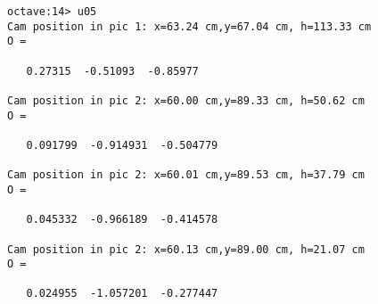 \lstset{language=matlab}
\begin{lstlisting}[caption={Ausgabe}]
octave:14> u05
Cam position in pic 1: x=63.24 cm,y=67.04 cm, h=113.33 cm
O =

   0.27315  -0.51093  -0.85977

Cam position in pic 2: x=60.00 cm,y=89.33 cm, h=50.62 cm
O =

   0.091799  -0.914931  -0.504779

Cam position in pic 2: x=60.01 cm,y=89.53 cm, h=37.79 cm
O =

   0.045332  -0.966189  -0.414578

Cam position in pic 2: x=60.13 cm,y=89.00 cm, h=21.07 cm
O =

   0.024955  -1.057201  -0.277447
\end{lstlisting}



